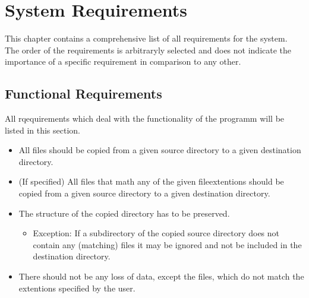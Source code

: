 \chapter{System Requirements}\label{cha:system_requirements}
This chapter contains a comprehensive list of all requirements for the system. 
The order of the requirements is arbitraryly selected and does not indicate the importance
of a specific requirement in comparison to any other.

\section{Functional Requirements}\label{sec:functional_requiremens}
All rqequirements which deal with the functionality of the programm will be listed in this section. 

\begin{itemize}
    \item All files should be copied from a given source directory to a given destination directory.
    \item (If specified) All files that math any of the given fileextentions should be copied from a given source directory to a given destination directory.
    \item The structure of the copied directory has to be preserved.
    \begin{itemize}
        \item Exception: If a subdirectory of the copied source directory does not contain any (matching) files it may be ignored and not be included in the destination directory.
    \end{itemize}
    \item There should not be any loss of data, except the files, which do not match the extentions specified by the user.
\end{itemize}
